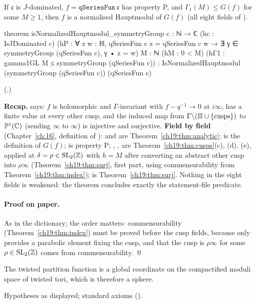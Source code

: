 \begin{theorem}\label{ch19:thm:haupt}
If $\mathfrak c$ is $J$-dominated, $f=\mathtt{qSeriesFun}\ \mathfrak c$ has property P, and $\Gamma_1(M)\le G(f)$ for some $M\ge1$, then $f$ is a normalised Hauptmodul
of $G(f)$ (all eight fields of ).
\end{theorem}
\begin{leancode}
theorem isNormalizedHauptmodul_symmetryGroup {c : ℕ → ℂ} (hc : IsJDominated c)
    (hP : ∀ z w : ℍ, qSeriesFun c z = qSeriesFun c w →
      ∃ γ ∈ symmetryGroup (qSeriesFun c), γ • z = w)
    {M : ℕ} (hM : 0 < M) (hΓ1 : gamma1GL M ≤ symmetryGroup (qSeriesFun c)) :
    IsNormalizedHauptmodul (symmetryGroup (qSeriesFun c)) (qSeriesFun c)
\end{leancode}
(.)
\begin{dictionary}
\textbf{Recap.}   says: $f$ is holomorphic and $\Gamma$-invariant with $f-q^{-1}\to0$ at $i\infty$, has
a finite value at every other cusp, and the induced map from $\Gamma\backslash(\mathbb{H}\cup\{\text{cusps}\})$ to $\mathbb{P}^1({\mathbb{C}})$ (sending
$\infty$ to $\infty$) is injective and surjective.  \textbf{Field by field} (Chapter~\ref{ch:16}, definition of ):  and  are
Theorem~\ref{ch19:thm:analytic};  is the definition of $G(f)$;  is property P; ,
,  are Theorem~\ref{ch19:thm:cusps}(c), (d), (e), applied at $\delta=\rho\in\mathrm{SL}_2(\mathbb{Z})$ with
$h=M$ after converting an abstract other cusp into $\rho\infty$ (Theorem~\ref{ch19:thm:surj}, first part, using commensurability from
Theorem~\ref{ch19:thm:index});  is Theorem~\ref{ch19:thm:surj}.  Nothing in the eight fields is weakened: the theorem
concludes exactly the statement-file predicate.
\end{dictionary}
\paragraph{Proof on paper.}  As in the dictionary; the order matters: commensurability (Theorem~\ref{ch19:thm:index}) must be proved before
the cusp fields, because  only provides a parabolic element fixing the cusp, and that the cusp is $\rho\infty$ for some
$\rho\in\mathrm{SL}_2(\mathbb{Z})$ comes from commensurability. \qed
\begin{physics}The twisted partition function is a global coordinate on the compactified moduli space of twisted tori, which is
therefore a sphere.\end{physics}
\begin{status}Hypotheses as displayed; standard axioms ().\end{status}

